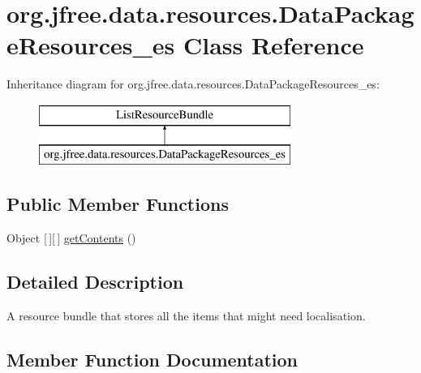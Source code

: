 \hypertarget{classorg_1_1jfree_1_1data_1_1resources_1_1_data_package_resources__es}{}\section{org.\+jfree.\+data.\+resources.\+Data\+Package\+Resources\+\_\+es Class Reference}
\label{classorg_1_1jfree_1_1data_1_1resources_1_1_data_package_resources__es}
Inheritance diagram for org.\+jfree.\+data.\+resources.\+Data\+Package\+Resources\+\_\+es\+:\begin{figure}[H]
\begin{center}
\leavevmode
\includegraphics[height=2.000000cm]{classorg_1_1jfree_1_1data_1_1resources_1_1_data_package_resources__es}
\end{center}
\end{figure}
\subsection*{Public Member Functions}
\begin{DoxyCompactItemize}
\item 
Object \mbox{[}$\,$\mbox{]}\mbox{[}$\,$\mbox{]} \mbox{\hyperlink{classorg_1_1jfree_1_1data_1_1resources_1_1_data_package_resources__es_a29bc38a9836c45572358ed1ff2733da0}{get\+Contents}} ()
\end{DoxyCompactItemize}


\subsection{Detailed Description}
A resource bundle that stores all the items that might need localisation. 

\subsection{Member Function Documentation}
\mbox{\label{classorg_1_1jfree_1_1data_1_1resources_1_1_data_package_resources__es_a29bc38a9836c45572358ed1ff2733da0}} 
